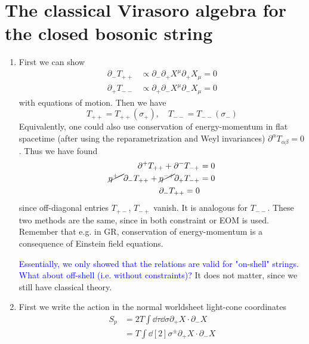 \section{The classical Virasoro algebra for the closed bosonic string}

\begin{enumerate}[label=(\alph*)]
	\item 
		First we can show
		\begin{align*}
			\partial_- T_{++} &\propto \partial_- \partial_+ X^\mu \partial_+ X_\mu = 0 \\
			\partial_+ T_{--} &\propto \partial_+ \partial_- X^\mu \partial_- X_\mu = 0
		\end{align*}
		with equations of motion. Then we have
		\begin{equation}
			T_{++} = T_{++}(\sigma_+), \quad T_{--} = T_{--}(\sigma_-)
		\end{equation}
		Equivalently, one could also use conservation of energy-momentum in flat spacetime (after using the reparametrization and Weyl invariances) $\partial^\alpha T_{\alpha\beta} = 0$. Thus we have found
		\begin{align*}
			\partial^+ T_{++} + \partial^- T_{-+} &= 0 	 \\
			\cancel{\eta^{+-}}\partial_- T_{++} + \cancel{\eta^{-+}} \partial_+ T_{-+} &= 0 \\
			\partial_- T_{++} = 0
		\end{align*}
		since off-diagonal entries $T_{+-}$, $T_{-+}$ vanish. It is analogous for $T_{--}$. These two methods are the same, since in both constraint or EOM is used. Remember that e.g. in GR, conservation of energy-momentum is a consequence of Einstein field equations.
		
		\textcolor{blue}{Essentially, we only showed that the relations are valid for "on-shell" strings. What about off-shell (i.e. without constraints)?} It does not matter, since we still have classical theory.

	\item 
		First we write the action in the normal worldsheet light-cone coordinates
		\begin{align*}
			S_p &= 2 T \int \dd{\tau} \dd{\sigma} \partial_+ X \cdot \partial_- X \\
				 &= T \int \dd[2]{\sigma^{\pm}} \partial_+ X \cdot \partial_- X
		\end{align*}


\end{enumerate}
